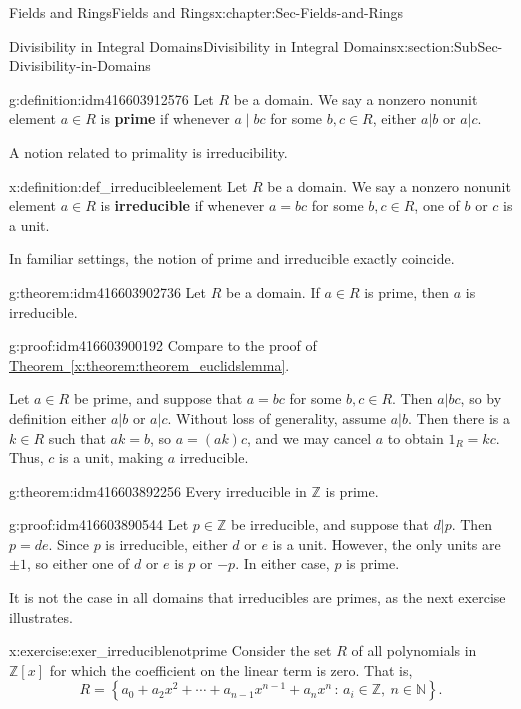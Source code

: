 \documentclass[oneside,10pt,]{book}
\newcommand{\terminology}[1]{\textbf{#1}}
\numberwithin{equation}{section}
\newcommand{\setof}[2]{{\left\{#1\,\colon\,#2\right\}}}
\def\Z{{\mathbb Z}}
\def\N{{\mathbb N}}
\begin{document}
\begin{chapterptx}{Fields and Rings}{}{Fields and Rings}{}{}{x:chapter:Sec-Fields-and-Rings}
\begin{sectionptx}{Divisibility in Integral Domains}{}{Divisibility in Integral Domains}{}{}{x:section:SubSec-Divisibility-in-Domains}
\begin{definition}{}{g:definition:idm416603912576}
Let \(R\) be a domain. We say a nonzero nonunit element \(a\in R\) is \terminology{prime} if whenever \(a\mid bc\) for some \(b,c\in R\), either \(a|b\) or \(a|c\).%
\end{definition}
A notion related to primality is irreducibility.%
\begin{definition}{}{x:definition:def_irreducibleelement}%
Let \(R\) be a domain. We say a nonzero nonunit element \(a\in R\) is \terminology{irreducible} if whenever \(a = bc\) for some \(b,c\in R\), one of \(b\) or \(c\) is a unit.%
\end{definition}
In familiar settings, the notion of prime and irreducible exactly coincide.%
\begin{theorem}{}{}{g:theorem:idm416603902736}%
Let \(R\) be a domain. If \(a\in R\) is prime, then \(a\) is irreducible.%
\end{theorem}
\begin{proofptx}{}{g:proof:idm416603900192}
Compare to the proof of \hyperref[x:theorem:theorem_euclidslemma]{Theorem~\ref{x:theorem:theorem_euclidslemma}}.%
\par
Let \(a\in R\) be prime, and suppose that \(a = bc\) for some \(b,c\in R\). Then \(a|bc\), so by definition either \(a|b\) or \(a|c\). Without loss of generality, assume \(a|b\). Then there is a \(k\in R\) such that \(ak=b\), so \(a = (ak)c\), and we may cancel \(a\) to obtain \(1_R = kc\). Thus, \(c\) is a unit, making \(a\) irreducible.%
\end{proofptx}
\begin{theorem}{}{}{g:theorem:idm416603892256}%
Every irreducible in \(\Z\) is prime.%
\end{theorem}
\begin{proofptx}{}{g:proof:idm416603890544}
Let \(p\in \Z\) be irreducible, and suppose that \(d|p\). Then \(p = de\). Since \(p\) is irreducible, either \(d\) or \(e\) is a unit. However, the only units are \(\pm 1\), so either one of \(d\) or \(e\) is \(p\) or \(-p\). In either case, \(p\) is prime.%
\end{proofptx}
It is not the case in all domains that irreducibles are primes, as the next exercise illustrates.%
\begin{inlineexercise}{}{x:exercise:exer_irreduciblenotprime}%
Consider the set \(R\) of all polynomials in \(\Z[x]\) for which the coefficient on the linear term is zero. That is,%
\begin{equation*}
R = \setof{a_0 + a_2 x^2 + \cdots + a_{n-1} x^{n-1} + a_n x^n}{a_i\in \Z,\ n\in\N}\text{.}
\end{equation*}

\end{inlineexercise}
\end{sectionptx}
\end{chapterptx}
\end{document}
